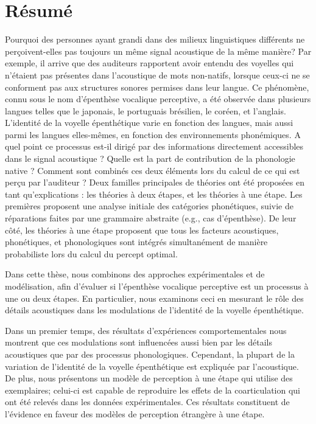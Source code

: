 \documentclass[12pt, twoside]{report}
\begin{document}
\chapter*{Résumé}
Pourquoi des personnes ayant grandi dans des milieux linguistiques différents ne perçoivent-elles pas toujours un même signal acoustique de la même manière? Par exemple, il arrive que des auditeurs rapportent avoir entendu des voyelles qui n'étaient pas présentes dans l'acoustique de mots non-natifs, lorsque ceux-ci ne se conforment pas aux structures sonores permises dans leur langue. Ce phénomène, connu sous le nom d'épenthèse vocalique perceptive, a été observée dans plusieurs langues telles que le japonais, le portuguais brésilien, le coréen, et l'anglais. L'identité de la voyelle épenthétique varie en fonction des langues, mais aussi parmi les langues elles-mêmes, en fonction des environnements phonémiques.
A quel point ce processus est-il dirigé par des informations directement accessibles dans le signal acoustique ? Quelle est la part de contribution de la phonologie native ? Comment sont combinés ces deux éléments lors du calcul de ce qui est perçu par l'auditeur ? Deux familles principales de théories ont été proposées en tant qu'explications : les théories à deux étapes, et les théories à une étape. Les premières proposent une analyse initiale des catégories phonétiques, suivie de réparations faites par une grammaire abstraite (e.g., cas d'épenthèse). De leur côté, les théories à une étape proposent que tous les facteurs acoustiques, phonétiques, et phonologiques sont intégrés simultanément de manière probabiliste lors du calcul du percept optimal.

Dans cette thèse, nous combinons des approches expérimentales et de modélisation, afin d'évaluer si l'épenthèse vocalique perceptive est un processus à une ou deux étapes. En particulier, nous examinons ceci en mesurant le rôle des détails acoustiques dans les modulations de l'identité de la voyelle épenthétique.

Dans un premier temps, des résultats d'expériences comportementales nous montrent que ces modulations sont influencées aussi bien par les détails acoustiques que par des processus phonologiques. Cependant, la plupart de la variation de l'identité de la voyelle épenthétique est expliquée par l'acoustique. De plus, nous présentons un modèle de perception à une étape qui utilise des exemplaires; celui-ci est capable de reproduire les effets de la coarticulation qui ont été relevés dans les données expérimentales. Ces résultats constituent de l'évidence en faveur des modèles de perception étrangère à une étape.    
\end{document}
